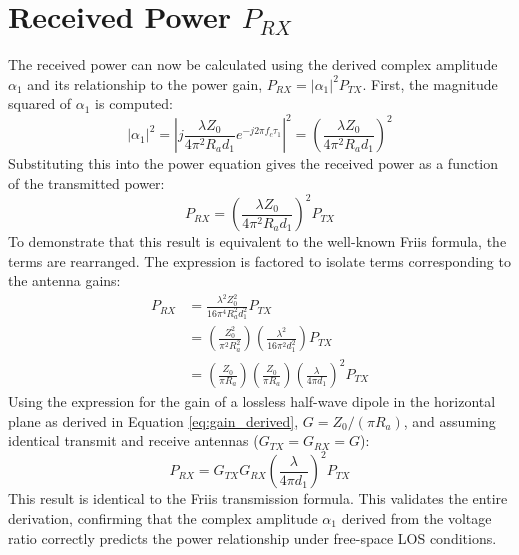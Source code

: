 \section{Received Power $P_{RX}$}
The received power can now be calculated using the derived complex amplitude $\alpha_1$ and its relationship to the power gain, $P_{RX} = |\alpha_1|^2 P_{TX}$. First, the magnitude squared of $\alpha_1$ is computed:
\begin{equation}
	|\alpha_1|^2 = \left| j \frac{\lambda Z_0}{4\pi^2 R_a d_1} e^{-j2\pi f_c \tau_1} \right|^2 = \left( \frac{\lambda Z_0}{4\pi^2 R_a d_1} \right)^2
\end{equation}
Substituting this into the power equation gives the received power as a function of the transmitted power:
\begin{equation}
	P_{RX} = \left( \frac{\lambda Z_0}{4\pi^2 R_a d_1} \right)^2 P_{TX}
\end{equation}
To demonstrate that this result is equivalent to the well-known Friis formula, the terms are rearranged. The expression is factored to isolate terms corresponding to the antenna gains:
\begin{align}
	P_{RX} &= \frac{\lambda^2 Z_0^2}{16\pi^4 R_a^2 d_1^2} P_{TX} \\
	&= \left( \frac{Z_0^2}{\pi^2 R_a^2} \right) \left( \frac{\lambda^2}{16\pi^2 d_1^2} \right) P_{TX} \\
	&= \left( \frac{Z_0}{\pi R_a} \right) \left( \frac{Z_0}{\pi R_a} \right) \left( \frac{\lambda}{4\pi d_1} \right)^2 P_{TX}
\end{align}
Using the expression for the gain of a lossless half-wave dipole in the horizontal plane as derived in Equation \ref{eq:gain_derived}, $G = Z_0/(\pi R_a)$, and assuming identical transmit and receive antennas ($G_{TX} = G_{RX} = G$):
\begin{equation}
	P_{RX} = G_{TX} G_{RX} \left( \frac{\lambda}{4\pi d_1} \right)^2 P_{TX} \label{eq:los_power_final_detailed}
\end{equation}
This result is identical to the Friis transmission formula. This validates the entire derivation, confirming that the complex amplitude $\alpha_1$ derived from the voltage ratio correctly predicts the power relationship under free-space LOS conditions.

